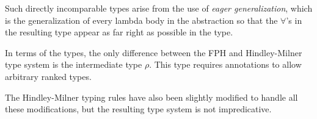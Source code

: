 Such directly incomparable types arise from the use of \textit{eager generalization}, which is the generalization of every lambda body in the abstraction so that the $\forall$'s in the resulting type appear as far right as possible in the type.

In terms of the types, the only difference between the FPH and Hindley-Milner type system is the intermediate type $\rho$. This type requires annotations to allow arbitrary ranked types.

The Hindley-Milner typing rules have also been slightly modified to handle all these modifications, but the resulting type system is not impredicative.

